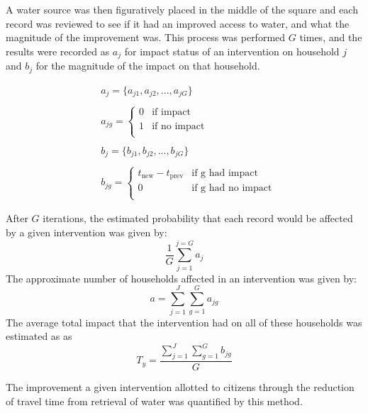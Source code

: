 A water source was then figuratively placed in the middle of the square and each record was reviewed to see if it had an improved access to water, and what the magnitude of the improvement was.
This process was performed $G$ times, and the results were recorded as $a_j$ for impact status of an intervention on household $j$ and $b_j$ for the magnitude of the impact on that household.

\begin{equation*}
\begin{aligned}
& a_j = \{a_{j1},a_{j2},...,a_{jG}\}\\\\
& a_{jg} =
\left\{
\begin{array}{ll}
      0 & \text{if impact}\\
      1 & \text{if no impact} \\
\end{array}
\right.\\\\
& b_j = \{b_{j1},b_{j2},...,b_{jG}\}\\\\
& b_{jg} =
\left\{
\begin{array}{ll}
      t_{\text{new}} - t_{\text{prev}} & \text{if g had impact} \\
      0 & \text{if g had no impact}\\
\end{array}
\right.
\end{aligned}
\end{equation*}

After $G$ iterations, the estimated probability that each record would be affected by a given intervention was given by:
\begin{equation*}
\frac{1}{G} \sum_{j=1}^{j=G} a_j
\end{equation*}
The approximate number of households affected in an intervention was given by:
\begin{equation*}
a = \sum_{j=1}^{J} \sum_{g=1}^{G} a_{jg}
\end{equation*}
The average total impact that the intervention had on all of these households was estimated as as
\begin{equation*}
T_y = \frac{\sum_{j=1}^{J} \sum_{g=1}^{G} b_{jg}}{G}
\end{equation*}

The improvement a given intervention allotted to citizens through the reduction of travel time from retrieval of water was quantified by this method.

